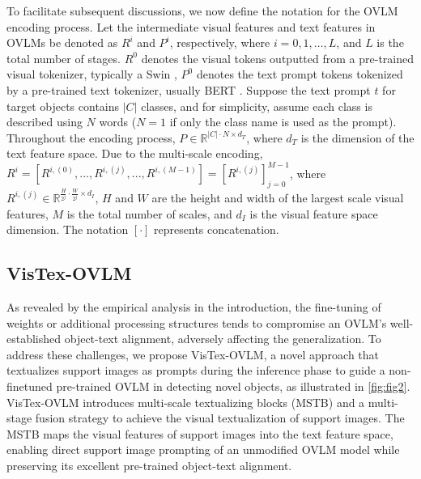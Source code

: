 \documentclass[10pt,twocolumn,letterpaper]{article}
\begin{document}
To facilitate subsequent discussions, we now define the notation for the OVLM encoding process. Let the intermediate visual features and text features in OVLMs be denoted as $R^i$ and $P^i$, respectively, where $i =0, 1, …, L$, and $L$ is the total number of stages. $R^0$ denotes the visual tokens outputted from a pre-trained visual tokenizer, typically a Swin \cite{liu2021swin}, $P^0$ denotes the text prompt tokens tokenized by a pre-trained text tokenizer, usually BERT \cite{kenton2019bert}. Suppose the text prompt $t$ for target objects contains $\lvert C\rvert$ classes, and for simplicity, assume each class is described using $N$ words ($N=1$ if only the class name is used as the prompt). Throughout the encoding process, $P\in \mathbb{R}^{\lvert C\rvert \cdot N\times d_{T}}$, where $d_T$ is the dimension of the text feature space. Due to the multi-scale encoding, $R^i = \left[ R^{i,(0)}, ..., R^{i,(j)}, ..., R^{i,(M-1)}\right]=\left[R^{i,(j)}\right]_{j=0}^{M-1}$, where $R^{i,(j)}\in \mathbb{R}^{\frac{H}{2^j}\cdot \frac{W}{2^j} \times d_I }$, $H$ and $W$ are the height and width of the largest scale visual features, $M$ is the total number of scales, and $d_I$ is the visual feature space dimension. The notation $\left[\cdot\right]$ represents concatenation.


\subsection{VisTex-OVLM}

As revealed by the empirical analysis in the introduction, the fine-tuning of weights or additional processing structures tends to compromise an OVLM’s well-established object-text alignment, adversely affecting the generalization. To address these challenges, we propose VisTex-OVLM, a novel approach that textualizes support images as prompts during the inference phase to guide a non-finetuned pre-trained OVLM in detecting novel objects, as illustrated in \cref{fig:fig2}. VisTex-OVLM introduces multi-scale textualizing blocks (MSTB) and a multi-stage fusion strategy to achieve the visual textualization of support images. The MSTB maps the visual features of support images into the text feature space, enabling direct support image prompting of an unmodified OVLM model while preserving its excellent pre-trained object-text alignment.
\end{document}
